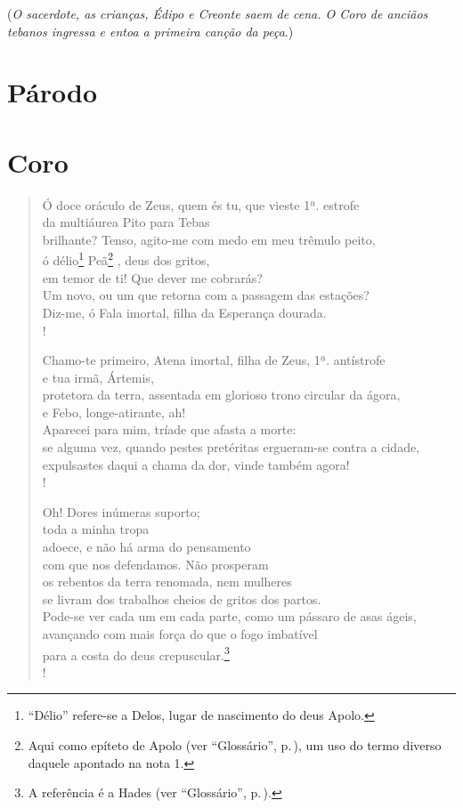 (\emph{O sacerdote, as crianças, Édipo e Creonte saem de cena. O Coro de
anciãos tebanos ingressa e entoa a primeira canção da peça}.)



\section{Párodo}

\newcommand{\marca}[1]{{\hfill \small#1}}

\section{Coro}

\begin{verse}
Ó doce oráculo de Zeus, quem és tu, que vieste \marca{1ª. estrofe}\\
da multiáurea Pito para Tebas\\
brilhante? Tenso, agito-me com medo em meu trêmulo peito,\\
ó délio\footnote{``Délio'' refere-se a Delos, lugar de nascimento do
        deus Apolo.} Peã\footnote{Aqui como epíteto de Apolo (ver ``Glossário'', p.\,\pageref{glossario}),
								  um uso do termo diverso daquele apontado na nota 1.}%
					    , deus dos gritos,\\
em temor de ti! Que dever me cobrarás?\\
Um novo, ou um que retorna com a passagem das estações?\\
Diz-me, ó Fala imortal, filha da Esperança dourada.\\!

Chamo-te primeiro, Atena imortal, filha de Zeus, 1ª. antístrofe\\
e tua irmã, Ártemis, \\
protetora da terra, assentada em glorioso trono circular da ágora,\\
e Febo, longe-atirante, ah!\\
Aparecei para mim, tríade que afasta a morte:\\
se alguma vez, quando pestes pretéritas ergueram-se contra a cidade,\\
expulsastes daqui a chama da dor, vinde também agora!\\!

Oh! Dores inúmeras suporto;\\ %
toda a minha tropa\\
adoece, e não há arma do pensamento \\
com que nos defendamos. Não prosperam\\
os rebentos da terra renomada, nem mulheres\\
se livram dos trabalhos cheios de gritos dos partos.\\
Pode-se ver cada um em cada parte, como um pássaro de asas ágeis,\\
avançando com mais força do que o fogo imbatível\\
para a costa do deus crepuscular.\footnote{A referência é a Hades (ver ``Glossário'', p.\,\pageref{glossario}).}\\!


\end{verse}

